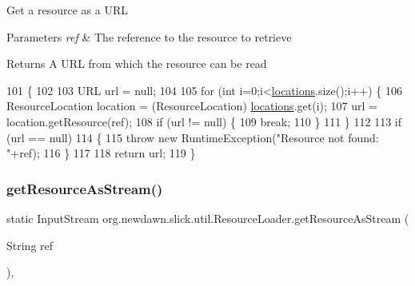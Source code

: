 Get a resource as a U\+RL


\begin{DoxyParams}{Parameters}
{\em ref} & The reference to the resource to retrieve \\
\hline
\end{DoxyParams}
\begin{DoxyReturn}{Returns}
A U\+RL from which the resource can be read 
\end{DoxyReturn}

\begin{DoxyCode}
101                                               \{
102 
103         URL url = null;
104         
105         \textcolor{keywordflow}{for} (\textcolor{keywordtype}{int} i=0;i<\mbox{\hyperlink{classorg_1_1newdawn_1_1slick_1_1util_1_1_resource_loader_a28036dde216244ec1fb50577d136eac3}{locations}}.size();i++) \{
106             ResourceLocation location = (ResourceLocation) \mbox{\hyperlink{classorg_1_1newdawn_1_1slick_1_1util_1_1_resource_loader_a28036dde216244ec1fb50577d136eac3}{locations}}.get(i);
107             url = location.getResource(ref);
108             \textcolor{keywordflow}{if} (url != null) \{
109                 \textcolor{keywordflow}{break};
110             \}
111         \}
112         
113         \textcolor{keywordflow}{if} (url == null)
114         \{
115             \textcolor{keywordflow}{throw} \textcolor{keyword}{new} RuntimeException(\textcolor{stringliteral}{"Resource not found: "}+ref);
116         \}
117             
118         \textcolor{keywordflow}{return} url;
119     \}
\end{DoxyCode}
\mbox{\label{classorg_1_1newdawn_1_1slick_1_1util_1_1_resource_loader_a7c561d9392956ba94e86a1d7a92031ce}} 
\subsubsection{\texorpdfstring{get\+Resource\+As\+Stream()}{getResourceAsStream()}}
{\footnotesize\ttfamily static Input\+Stream org.\+newdawn.\+slick.\+util.\+Resource\+Loader.\+get\+Resource\+As\+Stream (\begin{DoxyParamCaption}\item[{String}]{ref }\end{DoxyParamCaption})\hspace{0.3cm}{\ttfamily [inline]}, {\ttfamily [static]}}

